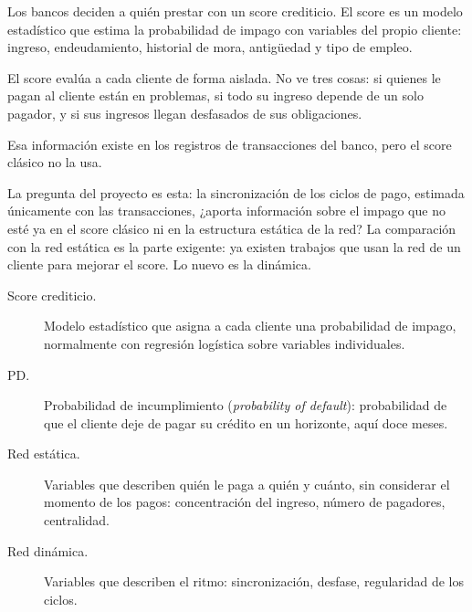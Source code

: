 \begin{decir}
Los bancos deciden a quién prestar con un score crediticio. El score es un modelo
estadístico que estima la probabilidad de impago con variables del propio cliente:
ingreso, endeudamiento, historial de mora, antigüedad y tipo de empleo.

El score evalúa a cada cliente de forma aislada. No ve tres cosas: si quienes le pagan
al cliente están en problemas, si todo su ingreso depende de un solo pagador, y si sus
ingresos llegan desfasados de sus obligaciones.

Esa información existe en los registros de transacciones del banco, pero el score
clásico no la usa.

La pregunta del proyecto es esta: la sincronización de los ciclos de pago, estimada
únicamente con las transacciones, ¿aporta información sobre el impago que no esté ya en
el score clásico ni en la estructura estática de la red? La comparación con la red
estática es la parte exigente: ya existen trabajos que usan la red de un cliente para
mejorar el score. Lo nuevo es la dinámica.
\end{decir}
\begin{terminos}
\begin{description}
\item[Score crediticio.] Modelo estadístico que asigna a cada cliente una probabilidad
de impago, normalmente con regresión logística sobre variables individuales.
\item[PD.] Probabilidad de incumplimiento (\emph{probability of default}): probabilidad
de que el cliente deje de pagar su crédito en un horizonte, aquí doce meses.
\item[Red estática.] Variables que describen quién le paga a quién y cuánto, sin
considerar el momento de los pagos: concentración del ingreso, número de pagadores,
centralidad.
\item[Red dinámica.] Variables que describen el ritmo: sincronización, desfase,
regularidad de los ciclos.
\end{description}
\end{terminos}
\begin{preguntas}
\end{preguntas}

